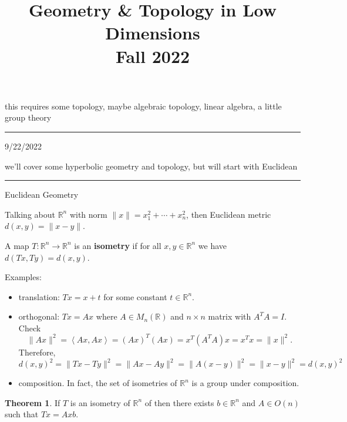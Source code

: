 \documentclass[12pt]{article}
\title{Geometry \& Topology in Low Dimensions \\
    \large Fall 2022
}
\author{}
\date{}
\newcommand{\keyword}[1]{\textbf{#1}}
\newcommand{\sepline}{\rule{\textwidth}{0.4pt}}
\theoremstyle{definition}
\newtheorem{theorem}{Theorem}
\newcommand{\R}{\mathbb{R}}
\newcommand{\<}{\left\langle}
\renewcommand{\>}{\right\rangle}
\begin{document}
\maketitle

this requires some topology, maybe algebraic topology, linear algebra, a little group theory

\sepline

9/22/2022

we'll cover some hyperbolic geometry and topology, but will start with Euclidean

\sepline

Euclidean Geometry

Talking about $\R^n$ with norm $\|x\| = x_1^2 + \cdots + x_n^2$, then Euclidean metric
$d(x, y) = \|x - y\|$.

A map $T : \R^n \to \R^n$ is an \keyword{isometry} if for all $x, y \in \R^n$ we have $d(Tx, Ty) = d(x, y)$.

Examples:
\begin{itemize}
    \item translation: $Tx = x + t$ for some constant $t \in \R^n$.
    \item orthogonal: $Tx = Ax$ where $A \in M_n(\R)$ and $n \times n$ matrix with $A^TA = I$.
    Check
    \[
        \|Ax\|^2
            = \<Ax, Ax\>
            = (Ax)^T(Ax)
            = x^T(A^TA)x
            = x^Tx
            = \|x\|^2.
    \]
    Therefore,
    \[
        d(x, y)^2
        = \|Tx - Ty\|^2
        = \|Ax - Ay\|^2
        = \|A(x - y)\|^2
        = \|x - y\|^2
        = d(x, y)^2
    \]
    \item composition.
    In fact, the set of isometries of $\R^n$ is a group under composition.
\end{itemize}

\begin{theorem}
    If $T$ is an isometry of $\R^n$ of then there exists $b \in \R^n$ and $A \in O(n)$ such that $Tx = Ax b$.
\end{theorem}
\end{document}
